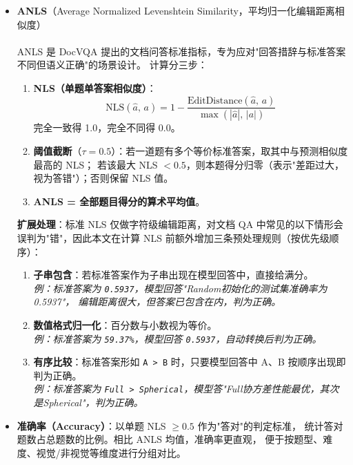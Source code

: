 ﻿\documentclass[UTF8, heading=true]{ctexart}
\newcommand{\upcite}[1]{\textsuperscript{\textsuperscript{\cite{#1}}}}
\begin{document}
\begin{itemize}
    \item \textbf{ANLS}（Average Normalized Levenshtein Similarity，平均归一化编辑距离相似度）

    ANLS 是 DocVQA\upcite{mathew2021docvqa} 提出的文档问答标准指标，专为应对"回答措辞与标准答案不同但语义正确"的场景设计。
    计算分三步：

    \begin{enumerate}
        \item \textbf{NLS（单题单答案相似度）}：
        \[
            \text{NLS}(\hat{a},\, a) = 1 - \frac{\text{EditDistance}(\hat{a},\, a)}{\max(|\hat{a}|,\, |a|)}
        \]
        完全一致得 1.0，完全不同得 0.0。

        \item \textbf{阈值截断}（$\tau = 0.5$）：若一道题有多个等价标准答案，取其中与预测相似度最高的 NLS；
        若该最大 NLS $< 0.5$，则本题得分归零（表示"差距过大，视为答错"）；否则保留 NLS 值。

        \item \textbf{ANLS = 全部题目得分的算术平均值}。
    \end{enumerate}

    \textbf{扩展处理}：标准 NLS 仅做字符级编辑距离，对文档 QA 中常见的以下情形会误判为"错"，因此本文在计算 NLS 前额外增加三条预处理规则（按优先级顺序）：

    \begin{enumerate}
        \item \textbf{子串包含}：若标准答案作为子串出现在模型回答中，直接给满分。\\
              \textit{例：标准答案为 \texttt{0.5937}，模型回答"Random初始化的测试集准确率为0.5937"，
              编辑距离很大，但答案已包含在内，判为正确。}

        \item \textbf{数值格式归一化}：百分数与小数视为等价。\\
              \textit{例：标准答案为 \texttt{59.37\%}，模型回答 \texttt{0.5937}，自动转换后判为正确。}

        \item \textbf{有序比较}：标准答案形如 \texttt{A > B} 时，只要模型回答中 A、B 按顺序出现即判为正确。\\
              \textit{例：标准答案为 \texttt{Full > Spherical}，模型答"Full协方差性能最优，其次是Spherical"，判为正确。}
    \end{enumerate}

    \item \textbf{准确率（Accuracy）}：以单题 NLS $\geq 0.5$ 作为"答对"的判定标准，
    统计答对题数占总题数的比例。相比 ANLS 均值，准确率更直观，
    便于按题型、难度、视觉/非视觉等维度进行分组对比。
\end{itemize}
\end{document}
